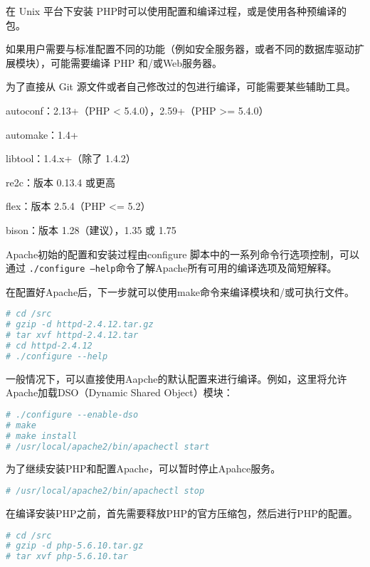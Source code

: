 在 Unix 平台下安装 PHP时可以使用配置和编译过程，或是使用各种预编译的包。

如果用户需要与标准配置不同的功能（例如安全服务器，或者不同的数据库驱动扩展模块），可能需要编译 PHP 和/或Web服务器。

为了直接从 Git 源文件或者自己修改过的包进行编译，可能需要某些辅助工具。

\begin{compactitem}
\item autoconf：2.13+（PHP < 5.4.0），2.59+（PHP >= 5.4.0）
\item automake：1.4+
\item libtool：1.4.x+（除了 1.4.2）
\item re2c：版本 0.13.4 或更高
\item flex：版本 2.5.4（PHP <= 5.2）
\item bison：版本 1.28（建议），1.35 或 1.75
\end{compactitem}

Apache初始的配置和安装过程由configure 脚本中的一系列命令行选项控制，可以通过 \texttt{./configure --help}命令了解Apache所有可用的编译选项及简短解释。

在配置好Apache后，下一步就可以使用make命令来编译模块和/或可执行文件。


\begin{lstlisting}[language=bash]
# cd /src
# gzip -d httpd-2.4.12.tar.gz
# tar xvf httpd-2.4.12.tar
# cd httpd-2.4.12
# ./configure --help
\end{lstlisting}

一般情况下，可以直接使用Aapche的默认配置来进行编译。例如，这里将允许Apache加载DSO（Dynamic Shared Object）模块：


\begin{lstlisting}[language=bash]
# ./configure --enable-dso
# make
# make install
# /usr/local/apache2/bin/apachectl start
\end{lstlisting}


为了继续安装PHP和配置Apache，可以暂时停止Apahce服务。


\begin{lstlisting}[language=bash]
# /usr/local/apache2/bin/apachectl stop
\end{lstlisting}


在编译安装PHP之前，首先需要释放PHP的官方压缩包，然后进行PHP的配置。

\begin{lstlisting}[language=bash]
# cd /src
# gzip -d php-5.6.10.tar.gz
# tar xvf php-5.6.10.tar
\end{lstlisting}

